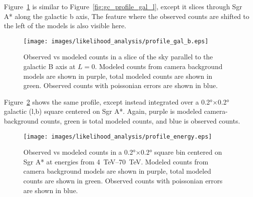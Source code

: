   Figure~\ref{fig:gc_profile_gal_b} is similar to Figure~\ref{fig:gc_profile_gal_l}, except it slices through Sgr A* along the galactic b axis,
  The feature where the observed counts are shifted to the left of the models is also visible here.

  \begin{figure}[h]
    \centering
    \texttt{[image: images/likelihood\_analysis/profile\_gal\_b.eps]}
    \caption[Galactic Center Profile vs Galactic B]{
      Observed vs modeled counts in a slice of the sky parallel to the galactic B axis at $L=0$.
      Modeled counts from camera background models are shown in purple, total modeled counts are shown in green.
      Observed counts with poissonian errors are shown in blue.
    }
    \label{fig:gc_profile_gal_b}
  \end{figure}

  Figure~\ref{fig:gc_profile_energy} shows the same profile, except instead integrated over a \ang{0.2}$\times$\ang{0.2} galactic (l,b) square centered on Sgr A*.
  Again, purple is modeled camera-background counts, green is total modeled counts, and blue is observed counts.
  
  \begin{figure}[h]
    \centering
    \texttt{[image: images/likelihood\_analysis/profile\_energy.eps]}
    \caption[Galactic Center Profile vs Energy]{
      Observed vs modeled counts in a \ang{0.2}$\times$\ang{0.2} square bin centered on Sgr A* at energies from \SIrange{4}{70}{TeV}.
      Modeled counts from camera background models are shown in purple, total modeled counts are shown in green.
      Observed counts with poissonian errors are shown in blue.
    }
    \label{fig:gc_profile_energy}
  \end{figure}
  
